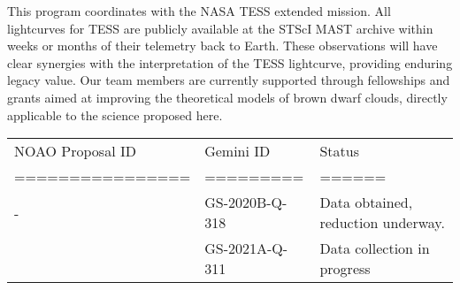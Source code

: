 \documentclass[11pt]{article}
\begin{document}
{%
%
%
%

\otherfacilities
This program coordinates with the NASA TESS extended mission.  All lightcurves for TESS are publicly available at the STScI MAST archive within weeks or months of their telemetry back to Earth.  These observations will have clear synergies with the interpretation of the TESS lightcurve, providing enduring legacy value.  Our team members are currently supported through fellowships and grants aimed at improving the theoretical models of brown dwarf clouds, directly applicable to the science proposed here.  

%
%
\thepast
\begin{tabular}{lll}
NOAO Proposal ID & Gemini ID & Status \\
================ & ========= & ====== \\
- & GS-2020B-Q-318  & Data obtained, reduction underway. \\
 & GS-2021A-Q-311 & Data collection in progress \\
\end{tabular}
 
}
\end{document}
